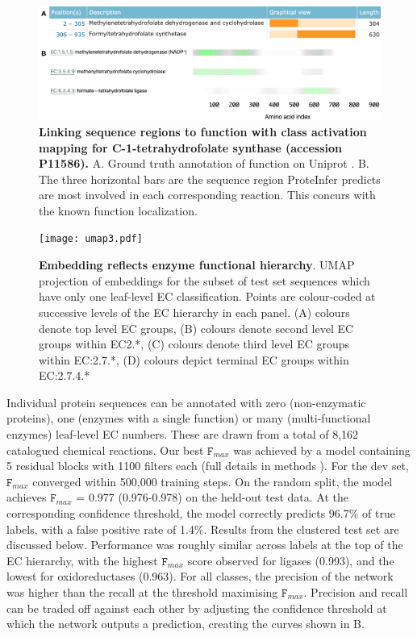 \begin{figure}[t]
  \centering
    \includegraphics[width=\textwidth]{tetrahydrofolate_synthase.png}
    \caption{\textbf{Linking sequence regions to function with class activation mapping for C-1-tetrahydrofolate synthase (accession P11586).} A. Ground truth annotation of function on Uniprot \citep{uniprotlatest}. B. The three horizontal bars are the sequence region ProteInfer predicts are most involved in each corresponding reaction. This concurs with the known function localization. }
    \label{fig:cam}
  \end{figure}

  \begin{figure}
    \centering
      \texttt{[image: umap3.pdf]}%
      \caption{\textbf{Embedding reflects enzyme functional hierarchy}. UMAP projection of embeddings for the subset of test set sequences which have only one leaf-level EC classification. Points are colour-coded at successive levels of the EC hierarchy in each panel. (A) colours denote top level EC groups, (B) colours denote second level EC groups within EC2.*, (C) colours denote third level EC groups within EC:2.7.*, (D) colours depict terminal EC groups within EC:2.7.4.* }
      \label{fig:umap}
    \end{figure}

Individual protein sequences can be annotated with zero (non-enzymatic proteins), one (enzymes with a single function) or many (multi-functional enzymes) leaf-level EC numbers. These are drawn from a total of 8,162 catalogued chemical reactions.
Our best $\texttt{F}_{max}$ was achieved by a model containing 5 residual blocks with 1100 filters each (full details in \textnormal{ methods}%
). For the dev set, $\texttt{F}_{max}$ converged within 500,000 training steps. On the random split, the model achieves $\texttt{F}_{max}$ = 0.977 (0.976-0.978) on the held-out test data. At the corresponding confidence threshold, the model correctly predicts 96.7\% of true labels, with a false positive rate of 1.4\%. Results from the clustered test set are discussed below.
Performance was roughly similar across labels at the top of the EC hierarchy, with the highest $\texttt{F}_{max}$ score observed for ligases (0.993), and the lowest for oxidoreductases (0.963). For all classes, the precision of the network was higher than the recall at the threshold maximising $\texttt{F}_{max}$. Precision and recall can be traded off against each other by adjusting the confidence threshold at which the network outputs a prediction, creating the curves shown in B.%



